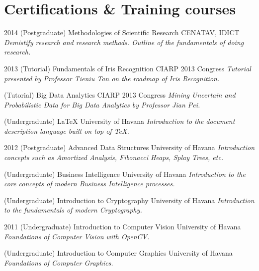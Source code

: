 \documentclass[]{friggeri-cv}
\begin{document}
\section{Certifications \& Training courses}
\begin{entrylist}
  \entry
    {2014}
    {(Postgraduate) Methodologies of Scientific Research}
    {CENATAV, IDICT}
    {\emph{Demistify research and research methods. Outline of the fundamentals of doing research.}}
\end{entrylist}

\begin{entrylist}    
  \entry
    {2013}
    {(Tutorial) Fundamentals of Iris Recognition}
    {CIARP 2013 Congress}
    {\emph{Tutorial presented by Professor Tieniu Tan on the roadmap of Iris Recognition.}}

  \entry
    {}
    {(Tutorial) Big Data Analytics}
    {CIARP 2013 Congress}
    {\emph{Mining Uncertain and Probabilistic Data for Big Data Analytics by Professor Jian Pei.}}
    
  \entry
    {}
    {(Undergraduate) \LaTeX}
    {University of Havana}
    {\emph{Introduction to the document description language built on top of \TeX.}}
\end{entrylist}
       
\begin{entrylist}
  \entry
    {2012}
    {(Postgraduate) Advanced Data Structures}
    {University of Havana}
    {\emph{Introduction concepts such as Amortized Analysis, Fibonacci Heaps, Splay Trees, etc.}}      

  \entry
    {}
    {(Undergraduate) Business Intelligence}
    {University of Havana}
    {\emph{Introduction to the core concepts of modern Business Intelligence processes.}}

  \entry
    {}
    {(Undergraduate) Introduction to Cryptography}
    {University of Havana}
    {\emph{Introduction to the fundamentals of modern Cryptography.}}
\end{entrylist}

\begin{entrylist}
  \entry
    {2011}
    {(Undergraduate) Introduction to Computer Vision}
    {University of Havana}
    {\emph{Foundations of Computer Vision with OpenCV.}}      

  \entry
    {}
    {(Undergraduate) Introduction to Computer Graphics}
    {University of Havana}
    {\emph{Foundations of Computer Graphics.}}
\end{entrylist}
\end{document}
